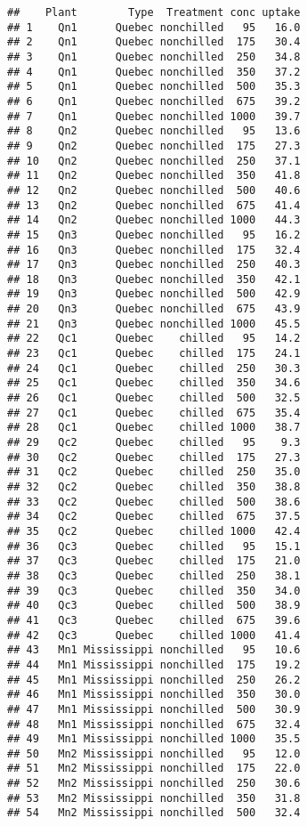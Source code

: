 \documentclass[
]{article}
\begin{document}
\begin{verbatim}
##    Plant        Type  Treatment conc uptake
## 1    Qn1      Quebec nonchilled   95   16.0
## 2    Qn1      Quebec nonchilled  175   30.4
## 3    Qn1      Quebec nonchilled  250   34.8
## 4    Qn1      Quebec nonchilled  350   37.2
## 5    Qn1      Quebec nonchilled  500   35.3
## 6    Qn1      Quebec nonchilled  675   39.2
## 7    Qn1      Quebec nonchilled 1000   39.7
## 8    Qn2      Quebec nonchilled   95   13.6
## 9    Qn2      Quebec nonchilled  175   27.3
## 10   Qn2      Quebec nonchilled  250   37.1
## 11   Qn2      Quebec nonchilled  350   41.8
## 12   Qn2      Quebec nonchilled  500   40.6
## 13   Qn2      Quebec nonchilled  675   41.4
## 14   Qn2      Quebec nonchilled 1000   44.3
## 15   Qn3      Quebec nonchilled   95   16.2
## 16   Qn3      Quebec nonchilled  175   32.4
## 17   Qn3      Quebec nonchilled  250   40.3
## 18   Qn3      Quebec nonchilled  350   42.1
## 19   Qn3      Quebec nonchilled  500   42.9
## 20   Qn3      Quebec nonchilled  675   43.9
## 21   Qn3      Quebec nonchilled 1000   45.5
## 22   Qc1      Quebec    chilled   95   14.2
## 23   Qc1      Quebec    chilled  175   24.1
## 24   Qc1      Quebec    chilled  250   30.3
## 25   Qc1      Quebec    chilled  350   34.6
## 26   Qc1      Quebec    chilled  500   32.5
## 27   Qc1      Quebec    chilled  675   35.4
## 28   Qc1      Quebec    chilled 1000   38.7
## 29   Qc2      Quebec    chilled   95    9.3
## 30   Qc2      Quebec    chilled  175   27.3
## 31   Qc2      Quebec    chilled  250   35.0
## 32   Qc2      Quebec    chilled  350   38.8
## 33   Qc2      Quebec    chilled  500   38.6
## 34   Qc2      Quebec    chilled  675   37.5
## 35   Qc2      Quebec    chilled 1000   42.4
## 36   Qc3      Quebec    chilled   95   15.1
## 37   Qc3      Quebec    chilled  175   21.0
## 38   Qc3      Quebec    chilled  250   38.1
## 39   Qc3      Quebec    chilled  350   34.0
## 40   Qc3      Quebec    chilled  500   38.9
## 41   Qc3      Quebec    chilled  675   39.6
## 42   Qc3      Quebec    chilled 1000   41.4
## 43   Mn1 Mississippi nonchilled   95   10.6
## 44   Mn1 Mississippi nonchilled  175   19.2
## 45   Mn1 Mississippi nonchilled  250   26.2
## 46   Mn1 Mississippi nonchilled  350   30.0
## 47   Mn1 Mississippi nonchilled  500   30.9
## 48   Mn1 Mississippi nonchilled  675   32.4
## 49   Mn1 Mississippi nonchilled 1000   35.5
## 50   Mn2 Mississippi nonchilled   95   12.0
## 51   Mn2 Mississippi nonchilled  175   22.0
## 52   Mn2 Mississippi nonchilled  250   30.6
## 53   Mn2 Mississippi nonchilled  350   31.8
## 54   Mn2 Mississippi nonchilled  500   32.4

\end{verbatim}
\end{document}
